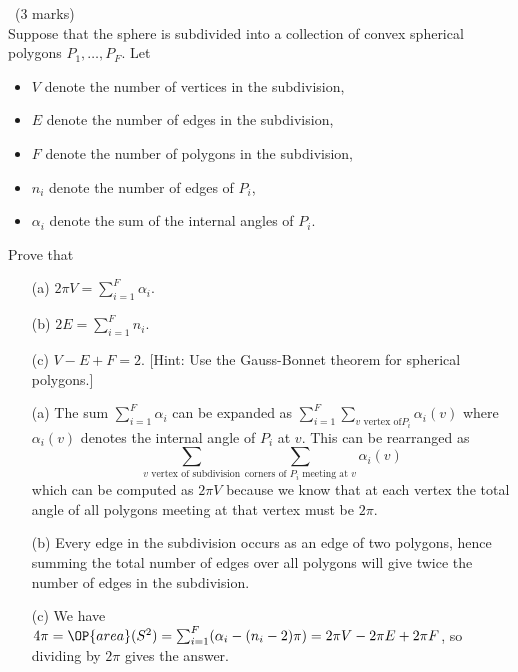 \documentclass[12pt]{article}
\begin{document}
\newpage

\begin{question}\ (3 marks)\\
  Suppose that the sphere is subdivided into a collection of convex spherical polygons $P_1,\ldots,P_F$. Let
  \begin{itemize}
  \item $V$ denote the number of vertices in the subdivision,
  \item $E$ denote the number of edges in the subdivision,
  \item $F$ denote the number of polygons in the subdivision,
  \item $n_i$ denote the number of edges of $P_i$,
  \item $\alpha_i$ denote the sum of the internal angles of $P_i$.
  \end{itemize}
  Prove that
  \begin{enumerate}
  \item[(a)] $2\pi V=\sum_{i=1}^F\alpha_i$.
  \item[(b)] $2E=\sum_{i=1}^Fn_i$.
  \item[(c)] $V-E+F=2$. [Hint: Use the Gauss-Bonnet theorem for spherical polygons.]
  \end{enumerate}
\end{question}

\begin{answer}
  \begin{enumerate}
  \item[(a)] The sum $\sum_{i=1}^F\alpha_i$ can be expanded as $\sum_{i=1}^F\sum_{v\mbox{ vertex of} P_i}\alpha_i(v)$ where $\alpha_i(v)$ denotes the internal angle of $P_i$ at $v$. This can be rearranged as
    \[\sum_{v\mbox{ vertex of subdivision}}\sum_{\mbox{corners of }P_i{\mbox{ meeting at }v}}\alpha_i(v)\]
    which can be computed as $2\pi V$ because we know that at each vertex the total angle of all polygons meeting at that vertex must be $2\pi$.
  \item[(b)] Every edge in the subdivision occurs as an edge of two polygons, hence summing the total number of edges over all polygons will give twice the number of edges in the subdivision.
  \item[(c)] We have $4\pi=\OP{area}(S^2)=\sum_{i=1}^F(\alpha_i-(n_i-2)\pi)=2\pi V-2\pi E+2\pi F$, so dividing by $2\pi$ gives the answer.
  \end{enumerate}
\end{answer}
\newpage

\vspace{1cm}
\end{document}

